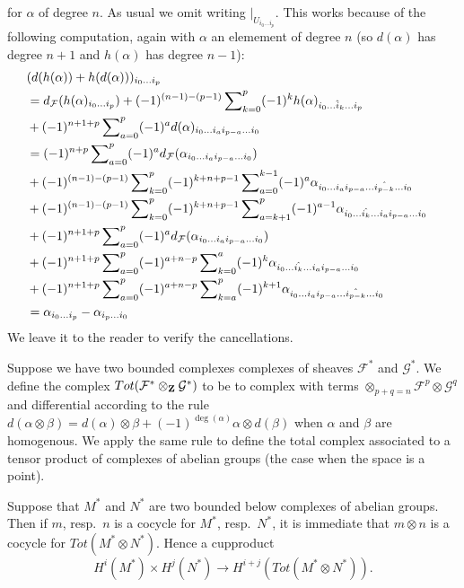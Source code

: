 for $\alpha$ of degree $n$. As usual we omit writing
$|_{U_{i_0\ldots i_p}}$. This works
because of the following computation, again with
$\alpha$ an elemement of degree $n$ (so $d(\alpha)$
has degree $n+1$ and $h(\alpha)$ has degree $n-1$):
\begin{align}
& (
d(h(\alpha)) + h(d(\alpha))
)_{i_0\ldots i_p}
\cr
& = 
d_{\mathcal F}(h(\alpha)_{i_0\ldots i_p})
+
(-1)^{(n-1)-(p-1)}
\sum\nolimits_{k=0}^p
(-1)^k
h(\alpha)_{i_0\ldots\hat i_k\ldots i_p}
\cr
& +
(-1)^{n+1+p}
\sum\nolimits_{a=0}^p
(-1)^a
d(\alpha)_{i_0\ldots i_a i_{p-a} \ldots i_0}
\cr
& =
(-1)^{n+p}
\sum\nolimits_{a=0}^p
(-1)^a
d_{\mathcal F}(\alpha_{i_0\ldots i_a i_{p-a} \ldots i_0})
\cr
& +
(-1)^{(n-1)-(p-1)}
\sum\nolimits_{k=0}^p
(-1)^{k+n+p-1}
\sum\nolimits_{a=0}^{k-1}
(-1)^a
\alpha_{i_0\ldots i_a i_{p-a}\ldots\hat{i_{p-k}}\ldots i_0}
\cr
& +
(-1)^{(n-1)-(p-1)}
\sum\nolimits_{k=0}^p
(-1)^{k+n+p-1}
\sum\nolimits_{a=k+1}^p
(-1)^{a-1}
\alpha_{i_0\ldots\hat{i_k}\ldots i_a i_{p-a}\ldots i_0}
\cr
& +
(-1)^{n+1+p}
\sum\nolimits_{a=0}^p
(-1)^a
d_{\mathcal F}(\alpha_{i_0\ldots i_a i_{p-a} \ldots i_0})
\cr
& +
(-1)^{n+1+p}
\sum\nolimits_{a=0}^p
(-1)^{a+n-p}
\sum\nolimits_{k=0}^a
(-1)^k
\alpha_{i_0\ldots \hat{i_k}\ldots i_a i_{p-a}\ldots i_0}
\cr
& +
(-1)^{n+1+p}
\sum\nolimits_{a=0}^p
(-1)^{a+n-p}
\sum\nolimits_{k=a}^p
(-1)^{k+1}
\alpha_{i_0\ldots i_a i_{p-a}\ldots \hat{i_{p-k}}\ldots i_0}
\cr
& = 
\alpha_{i_0 \ldots i_p} - \alpha_{i_p \ldots i_0}
\end{align}
We leave it to the reader to verify the cancellations.


\medskip\noindent
Suppose we have two bounded complexes complexes of sheaves
${\mathcal F}^*$ and ${\mathcal G}^*$. We define the complex
$Tot({\mathcal F}^*\otimes_{\bf Z} {\mathcal G}^*)$
to be to complex with terms $\otimes_{p+q=n} {\mathcal F}^p \otimes {\mathcal G}^q$
and differential according to the rule $d(\alpha \otimes \beta) =
d(\alpha)\otimes \beta + (-1)^{\deg(\alpha)} \alpha \otimes d(\beta)$
when $\alpha$ and $\beta$ are homogenous. We apply the same rule
to define the total complex associated to a tensor product of
complexes of abelian groups (the case when the space is a point).

\medskip\noindent
Suppose that $M^*$ and $N^*$ are two bounded below
complexes of abelian groups. Then if $m$, resp.\ $n$
is a cocycle for $M^*$, resp.\ $N^*$, it is immediate 
that $m \otimes n$ is a cocycle for $Tot(M^*\otimes N^*)$.
Hence a cupproduct
$$
H^i(M^*) \times H^j(N^*) \to H^{i+j}(Tot(M^*\otimes N^*)).
$$

